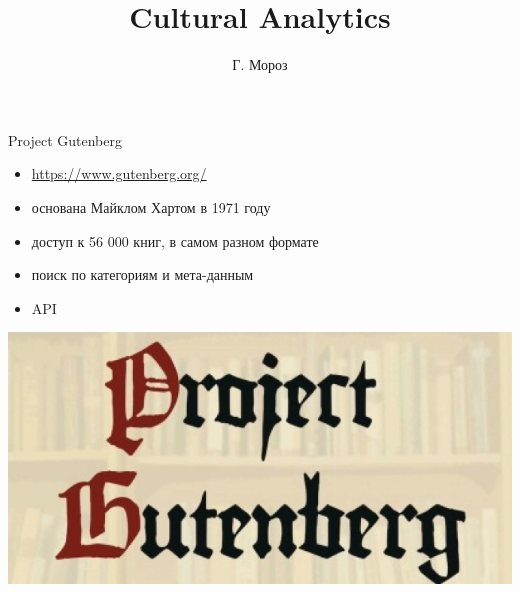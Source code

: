 \documentclass[13pt, t]{beamer}
\title{\huge Cultural Analytics}
\author[shortname]{Г. Мороз }
\date{\begin{center} 
\large 7 марта 2018 г.
\end{center}}
\begin{document}
\begin{frame}[plain]
\maketitle
\end{frame}


\begin{frame}{Project Gutenberg}
\begin{itemize}
\item \href{/}{\alert {https://www.gutenberg.org/}}
\item основана Майклом Хартом в 1971 году
\item доступ к 56 000 книг, в самом разном формате
\item поиск по категориям и мета-данным
\item API
\end{itemize}
\vfill
\begin{center}
\includegraphics[width=0.5\linewidth]{images/01-gutenberg.jpg}
\end{center}
\end{frame}
\end{document}
